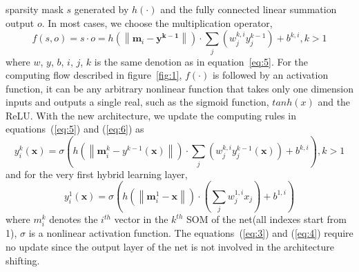 \documentclass[3p,times,procedia]{elsarticle}
\begin{document}
sparsity mask $s$ generated by $h(\cdot)$ 
and the fully connected linear summation 
output $o$. In most cases, we choose the
multiplication operator,
\begin{equation}
	f(s,o) = s\cdot o = 
	h\left(
	\left\|
	\mathbf{m}_i-\mathbf{y^{k-1}}
	\right\|
	\right)
	\cdot
	\sum_j
	\left(
	w_j^{k,i}y_j^{k-1}
	\right)
	+b^{k,i},k>1
	\label{eq:14}
\end{equation}
where $w$, $y$, $b$, $i$, $j$, $k$ is the
same denotion as in equation~\ref{eq:5}.
For the computing flow described in 
figure~\ref{fig:1}, $f(\cdot) $ is followed 
by an activation function, it can be any 
arbitrary nonlinear function that takes 
only one dimension inputs and outputs a 
single real, such as the sigmoid function, 
$tanh(x)$ and the ReLU. With the new 
architecture, we update the computing rules 
in equations~(\ref{eq:5}) and (\ref{eq:6}) as 
\begin{equation}
	y_i^k(\mathbf{x})=
	\sigma\left(
	h\left(
	\left\|
	\mathbf{m}_i^k-y^{k-1}(\mathbf{x})
	\right\|
	\right)\cdot
	\sum_j\left(
	w_j^{k,i}y_j^{k-1}(\mathbf{x})
	\right) + b^{k,i}
	\right), k>1
	\label{eq:15}
\end{equation}
and for the very first hybrid learning layer,  
\begin{equation}
	y_i^1(\mathbf{x})=
	\sigma\left(
	h\left(
	\left\|
	\mathbf{m}_i^1-\mathbf{x}
	\right\|
	\right)\cdot
	\left(
	\sum_j w_j^{1,i}x_j
	\right) + b^{1,i}
	\right)
	\label{eq:16}
\end{equation}
where $m^k_i$ denotes the $i^{th}$ vector
in the $k^{th}$ SOM of the net(all indexes
start from 1), $\sigma$ is a nonlinear 
activation function.
The equations~(\ref{eq:3}) and (\ref{eq:4})
require no update since the output layer
of the net is not involved in the 
architecture shifting.
\end{document}
